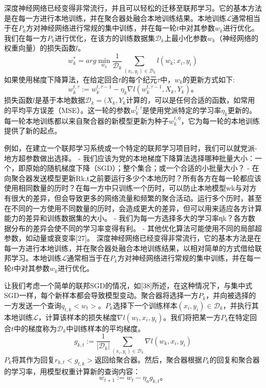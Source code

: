 深度神经网络已经变得非常流行，并且可以轻松的迁移至联邦学习。它的基本方法是在每一方进行本地训练，并在聚合器处融合本地训练结果。本地训练$\mathcal{L}$通常相当于在$P_{k}$方对神经网络进行常规的集中训练，并在每一轮$t$中对其参数$w_{k}$进行优化。我们在每一方$P_{k}$进行优化，在该方的训练数据集$\mathcal{D}_{k}$上最小化参数$w_{k}$（神经网络的权重向量）的损失函数$l$。
$$
w^{*}_{k} = arg \min_{w_{k}}\frac{1}{\mathcal{D}_{k}}\sum_{(x_{i}, y_{i}) \in \mathcal{D}_{k}} l(w_{k}; x_{i}, y_{i})
$$
如果使用梯度下降算法，在给定回合$t$的每个纪元$\tau$中，$w_{k}$的更新方式如下:
$$
w^{t, \tau}_{k} := w^{t, \tau - 1}_{k} - \eta_{k}\nabla l(w^{t, \tau - 1}_{k}, X_{k}, Y_{k})。
$$
损失函数$l$是基于本地数据$\mathcal{D}_{k} = (X_{k}, Y_{k}$计算的，可以是任何合适的函数，如常用的平均平方误差（MSE）。这一轮的参数$w^{t,\tau}_{k}$是使用党派特定的学习率$\eta_{k}$更新的。每一轮本地训练都以来自聚合器的新模型更新为种子$w^{t, 0}_{k}$，它为每一轮的本地训练提供了新的起点。

例如，在建立一个联邦学习系统或一个特定的联邦学习项目时，我们可以就党派-地方超参数做出选择。
- 我们应该为党的本地梯度下降算法选择哪种批量大小：一个，即原始的随机梯度下降（SGD）；整个集合；或一个合适的小批量大小？
- 在向聚合器发送模型更新Rk,t之前要运行多少个本地历时？所有各方在每一轮都应该使用相同数量的历时？在每一方中只训练一个历时，可以防止本地模型wk与对方有很大的差异，但会导致更多的网络流量和频繁的聚合活动。运行多个历时，甚至在不同的一方使用不同数量的历时，会造成更大的差异，但可以用来适应各方计算能力的差异和训练数据集的大小。
- 我们为每一方选择多大的学习率ηk？各方数据分布的差异会使不同的学习率变得有利。
- 其他优化算法可能使用不同的局部超参数，如动量或衰变率[27]。
深度神经网络已经变得非常流行，它的基本方法是在每一方进行本地训练，并在聚合器处融合本地训练结果，以相对简单的方式借给联邦学习。本地训练$\mathcal{L}$通常相当于在$P_{k}$方对神经网络进行常规的集中训练，并在每一轮$t$中对其参数$w_{k}$进行优化。

让我们考虑一个简单的联邦SGD的情况，如[38]所述，在这种情况下，与集中式SGD一样，每个新样本都会导致模型变动。聚合器将选择一方$P_{k}$，并向被选择的一方发送一个查询$q_{t, k}<w_{t}>$。$P_{k}$选择下一个训练样本$(x_{i}, y_{i}) \in \mathcal{D}_{k}$，并执行其本地训练$\mathcal{L}$，计算该样本的损失梯度$\nabla l(w_{t}, x_{i}, y_{i})$。我们将把某一方$P_{k}$在特定回合$t$中的梯度称为$\mathcal{D}_{k}$中训练样本的平均梯度。
$$
g_{k, t} := \frac{1}{|\mathcal{D}_{k}|} \sum_{(x_{i}, y_{i}) \in \mathcal{D}_{k}} \nabla l(w_{k}, x_{i}, y_{i})
$$
$P_{k}$将其作为回复$r_{k, t}<g_{t,k}>$返回给聚合器。然后，聚合器根据$P_{k}$的回复和聚合器的学习率，用模型权重计算新的查询内容：
$$
w_{t+1} := w_{t} - \eta_{a}g_{k, t}。
$$

